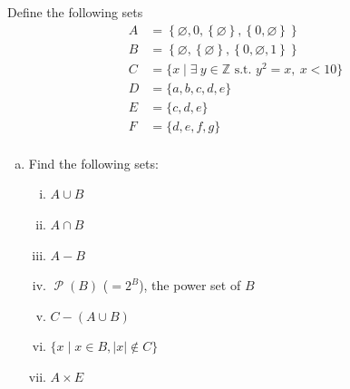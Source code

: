 \documentclass[12pt,letterpaper]{article}
\newcommand\Z{\mathbb Z}
\newcommand\Pow{\ensuremath{\operatorname{\mathcal{P}}}}
\begin{document}
Define the following sets
\begin{align*}
	A &= \left\{\varnothing, 0, \left\{\varnothing\right\},
\left\{0,\varnothing\right\} \right\} \\
	B &= \left\{\varnothing, \left\{\varnothing\right\},
\left\{0, \varnothing, 1\right\} \right\} \\
	C &= \{x \mid \exists \ y \in \Z \text{ s.t. } y^2=x, \ x < 10 \} \\
    D &= \{a, b, c, d, e\} \\
    E &= \{c, d, e\} \\
    F &= \{d, e, f, g\} \\
\end{align*}
\begin{enumerate}[a.]
    \item Find the following sets:
  		\begin{enumerate}[i.]
  			\item $A \cup B$
  			\begin{mdframed} \vspace{0.5cm} \end{mdframed}
      		\item $A \cap B$
      		\begin{mdframed} \vspace{0.5cm} \end{mdframed}
      		\item $A - B$
      		\begin{mdframed} \vspace{0.5cm} \end{mdframed}
      		\item $\Pow(B)$ ($=2^B$), the power set of $B$
      		\begin{mdframed} \vspace{0.5cm} \end{mdframed}
      		\item $C - (A \cup B)$
      		\begin{mdframed} \vspace{0.5cm} \end{mdframed}
      		\item $\{x \mid x \in B, |x| \notin C\}$
      		\begin{mdframed} \vspace{0.5cm} \end{mdframed}
            \item $A \times E$
            \begin{mdframed} \vspace{0.5cm} \end{mdframed}

\end{enumerate}
\end{enumerate}
\end{document}
